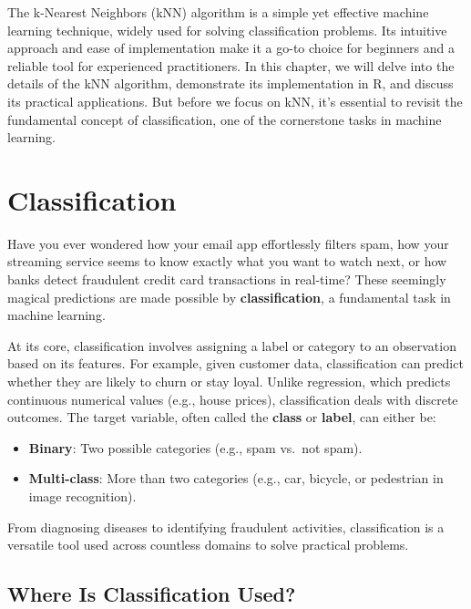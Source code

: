 \documentclass[
]{book}
\providecommand{\tightlist}{%
  \setlength{\itemsep}{0pt}\setlength{\parskip}{0pt}}
\theoremstyle{definition}
\theoremstyle{definition}
\theoremstyle{definition}
\theoremstyle{definition}
\theoremstyle{remark}
\begin{document}
The k-Nearest Neighbors (kNN) algorithm is a simple yet effective machine learning technique, widely used for solving classification problems. Its intuitive approach and ease of implementation make it a go-to choice for beginners and a reliable tool for experienced practitioners. In this chapter, we will delve into the details of the kNN algorithm, demonstrate its implementation in R, and discuss its practical applications. But before we focus on kNN, it's essential to revisit the fundamental concept of classification, one of the cornerstone tasks in machine learning.

\section{Classification}\label{classification}

Have you ever wondered how your email app effortlessly filters spam, how your streaming service seems to know exactly what you want to watch next, or how banks detect fraudulent credit card transactions in real-time? These seemingly magical predictions are made possible by \textbf{classification}, a fundamental task in machine learning.

At its core, classification involves assigning a label or category to an observation based on its features. For example, given customer data, classification can predict whether they are likely to churn or stay loyal. Unlike regression, which predicts continuous numerical values (e.g., house prices), classification deals with discrete outcomes. The target variable, often called the \textbf{class} or \textbf{label}, can either be:

\begin{itemize}
\tightlist
\item
  \textbf{Binary}: Two possible categories (e.g., spam vs.~not spam).\\
\item
  \textbf{Multi-class}: More than two categories (e.g., car, bicycle, or pedestrian in image recognition).
\end{itemize}

From diagnosing diseases to identifying fraudulent activities, classification is a versatile tool used across countless domains to solve practical problems.

\subsection*{Where Is Classification Used?}\label{where-is-classification-used}
\end{document}

